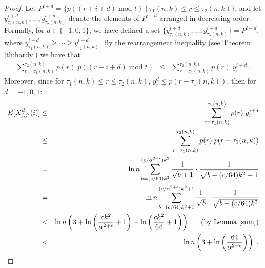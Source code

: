 \documentclass[11pt]{article}
\begin{document}
\begin{proof}
Let $P^{i+d} = \{ p((r+i+d)\; \text{mod } t) \mid \tau_1(n,k) \leq r \leq \tau_2(n,k) \}$, and 
let $y^{i+d}_{\tau_1(n,k)}, \ldots, y^{i+d}_{\tau_2(n,k)}$ 
denote the elements of $P^{i+d}$ arranged in decreasing order. Formally, 
for $d \in \{-1,0,1\}$, we have defined a set
$\{y^{i+d}_{\tau_1(n,k)}, \ldots , y^{i+d}_{\tau_2(n,k)}\} = P^{i+d}$,
where $y^{i+d}_{\tau_1(n,k)} \ge \cdots \ge y^{i+d}_{\tau_2(n,k)}$.
By the rearrangement inequality (see Theorem \ref{th:hardy}) we have that 
\begin{eqnarray*}
	\sum_{r=\tau_1(n,k)}^{\tau_2(n,k)} p(r)\; p\left((r+i+d)\; \text{mod } t\right) 
	& \le & \sum_{r=\tau_1(n,k)}^{\tau_2(n,k)} p(r)\; y^{i+d}_r 
 \ .
\end{eqnarray*}
Moreover, since for $\tau_1(n,k) \le r \le \tau_2(n,k)$, 
$y^d_{r} \le p(r - \tau_1(n,k))$, then for $d = -1, 0, 1$:
\begin{eqnarray*}
	E[X^d_{j,j'}(i)] 
 	& \le & \sum_{r=\tau_1(n,k)}^{\tau_2(n,k)} p(r)\; y^{i+d}_r \\
	& \le &  \sum_{r=\tau_1(n,k)}^{\tau_2(n,k)} p(r)\; p(r-\tau_1(n,k)) \\
	& =  & \ln n \sum_{b = (c / 64  ) k^2 }^{(c/\alpha^{2 + \epsilon}) k^2} 
	\frac{1}{\sqrt{b + 1}} \cdot \frac{1}{\sqrt{b - (c / 64 ) k^2 + 1}} \\
	& =  & \ln n \sum_{b = (c / 64 ) k^2 +1}^{(c/\alpha^{2 + \epsilon} ) k^2 +1} 
	\frac{1}{\sqrt{b }} \cdot \frac{1}{\sqrt{b - (c / 64 ) k^2 }} \\ 
	& <  &  \ln n \left( 3 + \ln\left(\frac{c k^2}{\alpha^{2 + \epsilon}} +1 \right) 
            - \ln\left(  \frac{c k^2}{64  } + 1 \right) \right) 
               \,\,\,\,\,\,\,\, \text{ (by Lemma \ref{sum})}\\           
    & < &   \ln n \left( 3 + \ln\left(\frac{64}{\alpha^{2 +\epsilon }}  \right) \right)    
 \ .
\end{eqnarray*}

\end{proof}
\end{document}
